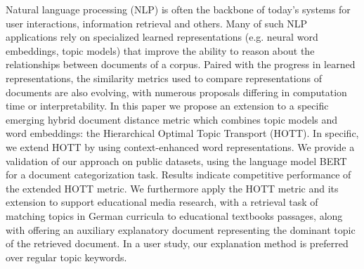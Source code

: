 Natural language processing (NLP) is often the backbone of today's systems for user interactions, information retrieval and others. Many of such NLP applications rely on specialized learned representations (e.g. neural word embeddings, topic models) that improve the ability to reason about the relationships between documents of a corpus. Paired with the progress in learned representations, the similarity metrics used to compare representations of documents are also evolving, with numerous proposals differing in computation time or interpretability. In this paper we propose an extension to a specific emerging hybrid document distance metric which combines topic models and word embeddings: the Hierarchical Optimal Topic Transport (HOTT). In specific, we extend HOTT by using context-enhanced word representations. We provide a validation of our approach on public datasets, using the language model BERT for a document categorization task. Results indicate competitive performance of the extended HOTT metric. We furthermore apply the HOTT metric and its extension to support educational media research, with a retrieval task of matching topics in German curricula to educational textbooks passages, along with offering an auxiliary explanatory document representing the dominant topic of the retrieved document. In a user study, our explanation method is preferred over regular topic keywords.
